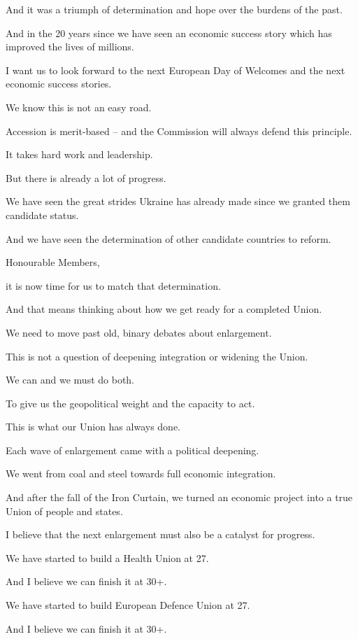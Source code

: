 \documentclass[a4paper,11pt]{article}
\begin{document}
And it was a triumph of determination and hope over the burdens of the past.

And in the 20 years since we have seen an economic success story which has improved the lives of millions.

I want us to look forward to the next European Day of Welcomes and the next economic success stories.

We know this is not an easy road.

Accession is merit-based – and the Commission will always defend this principle.

It takes hard work and leadership.

But there is already a lot of progress.

We have seen the great strides Ukraine has already made since we granted them candidate status.

And we have seen the determination of other candidate countries to reform.

 

Honourable Members,

it is now time for us to match that determination.

And that means thinking about how we get ready for a completed Union.

We need to move past old, binary debates about enlargement.

This is not a question of deepening integration or widening the Union.

We can and we must do both.

To give us the geopolitical weight and the capacity to act. 

This is what our Union has always done.

Each wave of enlargement came with a political deepening.

We went from coal and steel towards full economic integration.

And after the fall of the Iron Curtain, we turned an economic project into a true Union of people and states.

I believe that the next enlargement must also be a catalyst for progress.

We have started to build a Health Union at 27.

And I believe we can finish it at 30+.

We have started to build European Defence Union at 27.

And I believe we can finish it at 30+.
\end{document}
